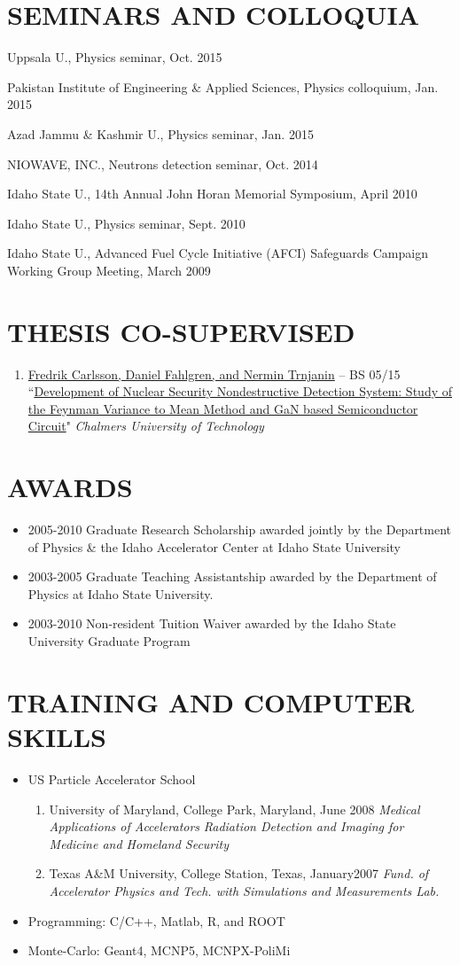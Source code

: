 \documentclass[paper=letter,fontsize=11pt]{scrartcl} %
\newcommand{\NewPart}[2]{\section*{\uppercase{#1} #2}}
\newcommand{\TalkEntry}[4]{
		\noindent #1, #2, #3 #4}
\newcommand{\ThesisEntry}[5]{
		\noindent #1 -- #2 #3 ``#4" \textit{#5}}
\begin{document}
\NewPart{Seminars and Colloquia}{}
\begin{etaremune}
\item\TalkEntry{Uppsala U.}{Physics seminar}{Oct. 2015}
\item\TalkEntry{Pakistan Institute of Engineering \& Applied Sciences}{Physics colloquium}{Jan. 2015}
\item\TalkEntry{Azad Jammu \& Kashmir U.}{Physics seminar}{Jan. 2015}
\item\TalkEntry{NIOWAVE, INC.}{Neutrons detection seminar}{Oct. 2014}
\item\TalkEntry{Idaho State U.}{14th Annual John Horan Memorial Symposium}{April 2010}
\item\TalkEntry{Idaho State U.}{Physics seminar}{Sept. 2010}
\item\TalkEntry{Idaho State U.}{Advanced Fuel Cycle Initiative (AFCI) Safeguards Campaign Working Group Meeting}{March 2009}
\end{etaremune}

\NewPart{Thesis Co-Supervised}{}
\begin{enumerate}
\item\ThesisEntry{\href{}{Fredrik Carlsson, Daniel Fahlgren, and Nermin Trnjanin}}{BS}{05/15}{\href{}{Development of Nuclear Security Nondestructive Detection System: Study of the Feynman Variance to Mean Method and GaN based Semiconductor Circuit}}{Chalmers University of Technology}
\end{enumerate}

\NewPart{Awards}{}
\begin{itemize}
\item 2005-2010 Graduate Research Scholarship awarded jointly by the Department of Physics \& the Idaho Accelerator Center at Idaho State University
\item 2003-2005 Graduate Teaching Assistantship awarded by the Department of Physics at Idaho State University.
\item 2003-2010 Non-resident Tuition Waiver awarded by the Idaho State University Graduate Program
\end{itemize}

\NewPart{TRAINING AND COMPUTER SKILLS}{}
\begin{itemize}
\item {US Particle Accelerator School}
\begin{enumerate}
\item {University of Maryland, College Park, Maryland}{, June 2008}
\subitem \textit{Medical Applications of Accelerators}
\subitem \textit{Radiation Detection and Imaging for Medicine and Homeland Security}

\item Texas A\&M University, College Station, Texas, January2007
\subitem \textit{Fund. of Accelerator Physics and Tech. with Simulations and Measurements Lab.}
\end{enumerate}

\item Programming: C/C++, Matlab, R, and ROOT
\item Monte-Carlo: Geant4, MCNP5, MCNPX-PoliMi

\end{itemize}
\end{document}
